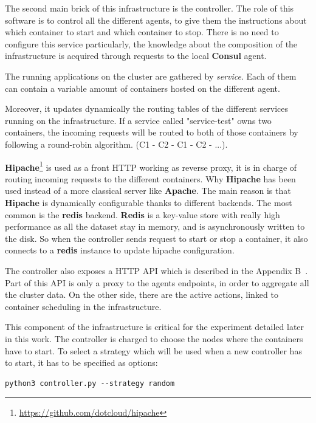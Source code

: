 The second main brick of this infrastructure is the controller. The role of
this software is to control all the different agents, to give them the
instructions about which container to start and which container to stop. There
is no need to configure this service particularly, the knowledge about the
composition of the infrastructure is acquired through requests to the local
\textbf{Consul} agent.

The running applications on the cluster are gathered by \textit{service}. Each
of them can contain a variable amount of containers hosted on the different agent.

Moreover, it updates dynamically the routing tables of the different services
running on the infrastructure. If a service called "service-test" owns two containers,
the incoming requests will be routed to both of those containers by following a
round-robin algorithm. (C1 - C2 - C1 - C2 - ...).

\textbf{Hipache}\footnote{\url{https://github.com/dotcloud/hipache}} is used as
a front HTTP working as reverse proxy, it is in charge of routing incoming
requests to the different containers.  Why \textbf{Hipache} has been used
instead of a more classical server like \textbf{Apache}. The main reason is
that \textbf{Hipache} is dynamically configurable thanks to different backends.
The most common is the \textbf{redis} backend. \textbf{Redis} is a key-value
store with really high performance as all the dataset stay in memory, and is
asynchronously written to the disk. So when the controller sends request to
start or stop a container, it also connects to a \textbf{redis} instance to
update hipache configuration.

The controller also exposes a HTTP API which is described in the Appendix
B~. Part of this API is only a proxy to the agents
endpoints, in order to aggregate all the cluster data. On the other side, there
are the active actions, linked to container scheduling in the infrastructure.


This component of the infrastructure is critical for the experiment detailed
later in this work. The controller is charged to choose the nodes where the
containers have to start. To select a strategy which will be used when a new
controller has to start, it has to be specified as options:

\begin{lstlisting}
python3 controller.py --strategy random
\end{lstlisting}


